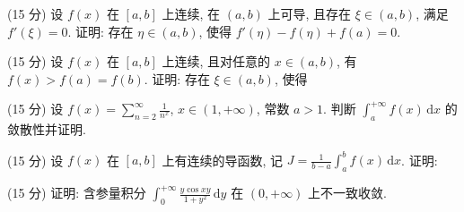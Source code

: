 \par{}
(15 分) 设 $f(x)$ 在 $[a, b]$ 上连续, 在 $(a, b)$ 上可导, 且存在 $\xi \in (a, b)$, 满足 $f'(\xi) = 0$. 证明: 存在 $\eta \in (a, b)$, 使得 $f'(\eta) - f(\eta) + f(a) = 0$.\par
\par{}
\par{}
(15 分) 设 $f(x)$ 在 $[a, b]$ 上连续, 且对任意的 $x \in (a, b)$, 有 $f(x) > f(a) = f(b)$. 证明: 存在 $\xi \in (a, b)$, 使得\par
\nopagebreak[4]
\par{}
(15 分) 设 $f(x) = \sum_{n=2}^{\infty} \frac{1}{n^x}$, $x \in (1, +\infty)$, 常数 $a > 1$. 判断 $\int_{a}^{+\infty} f(x) \, \mathrm{d}x$ 的敛散性并证明.\par
\par{}
\par{}
(15 分) 设 $f(x)$ 在 $[a, b]$ 上有连续的导函数, 记 $J = \frac{1}{b - a} \int_{a}^{b} f(x) \, \mathrm{d}x$. 证明:\par
\nopagebreak[4]
\par{}
(15 分) 证明: 含参量积分 $\int_{0}^{+\infty} \frac{y \cos xy}{1 + y^2} \, \mathrm{d}y$ 在 $(0, +\infty)$ 上不一致收敛.\par
